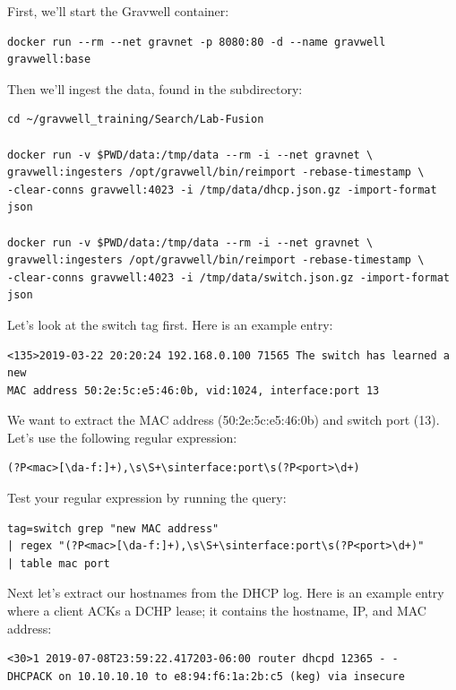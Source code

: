 First, we'll start the Gravwell container:

\begin{Verbatim}[breaklines=true]
docker run --rm --net gravnet -p 8080:80 -d --name gravwell gravwell:base
\end{Verbatim}

Then we'll ingest the data, found in the  subdirectory:

\begin{Verbatim}[breaklines=true]
cd ~/gravwell_training/Search/Lab-Fusion

docker run -v $PWD/data:/tmp/data --rm -i --net gravnet \
gravwell:ingesters /opt/gravwell/bin/reimport -rebase-timestamp \
-clear-conns gravwell:4023 -i /tmp/data/dhcp.json.gz -import-format json

docker run -v $PWD/data:/tmp/data --rm -i --net gravnet \
gravwell:ingesters /opt/gravwell/bin/reimport -rebase-timestamp \
-clear-conns gravwell:4023 -i /tmp/data/switch.json.gz -import-format json
\end{Verbatim}

Let's look at the switch tag first. Here is an example entry:

\begin{Verbatim}[breaklines=true]
<135>2019-03-22 20:20:24 192.168.0.100 71565 The switch has learned a new
MAC address 50:2e:5c:e5:46:0b, vid:1024, interface:port 13
\end{Verbatim}

We want to extract the MAC address (50:2e:5c:e5:46:0b) and switch
port (13). Let's use the following regular expression:

\begin{Verbatim}[breaklines=true]
(?P<mac>[\da-f:]+),\s\S+\sinterface:port\s(?P<port>\d+)
\end{Verbatim}

Test your regular expression by running the query:

\begin{Verbatim}[breaklines=true]
tag=switch grep "new MAC address"
| regex "(?P<mac>[\da-f:]+),\s\S+\sinterface:port\s(?P<port>\d+)"
| table mac port
\end{Verbatim}

Next let's extract our hostnames from the DHCP log. Here is an example
entry where a client ACKs a DCHP lease; it contains the hostname,
IP, and MAC address:

\begin{Verbatim}[breaklines=true]
<30>1 2019-07-08T23:59:22.417203-06:00 router dhcpd 12365 - - 
DHCPACK on 10.10.10.10 to e8:94:f6:1a:2b:c5 (keg) via insecure
\end{Verbatim}

